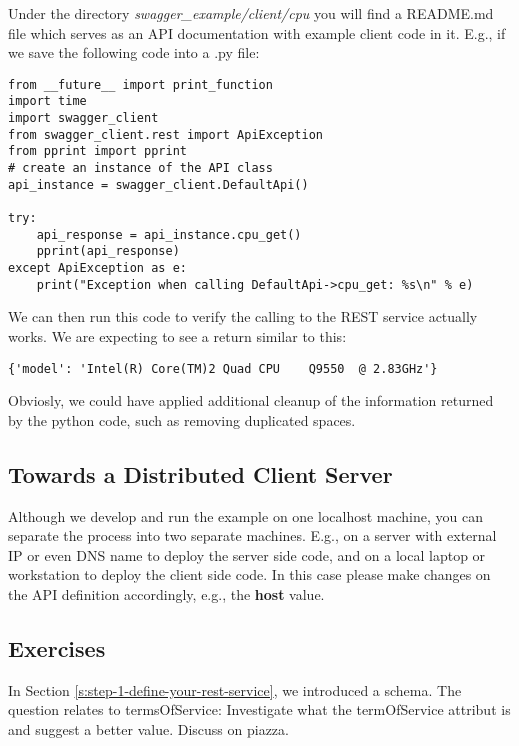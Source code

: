 Under the directory \emph{swagger\_example/client/cpu} you will find a
README.md file which serves as an API documentation with example client
code in it. E.g., if we save the following code into a .py file:

\begin{lstlisting}
from __future__ import print_function
import time
import swagger_client
from swagger_client.rest import ApiException
from pprint import pprint
# create an instance of the API class
api_instance = swagger_client.DefaultApi()

try:
    api_response = api_instance.cpu_get()
    pprint(api_response)
except ApiException as e:
    print("Exception when calling DefaultApi->cpu_get: %s\n" % e)
\end{lstlisting}

We can then run this code to verify the calling to the REST service
actually works. We are expecting to see a return similar to this:

\begin{lstlisting}
{'model': 'Intel(R) Core(TM)2 Quad CPU    Q9550  @ 2.83GHz'}
\end{lstlisting}

Obviosly, we could have applied additional cleanup of the information
returned by the python code, such as removing duplicated spaces.

\subsection{Towards a Distributed Client
Server}\label{towards-a-distributed-client-server}

Although we develop and run the example on one localhost machine, you
can separate the process into two separate machines. E.g., on a server
with external IP or even DNS name to deploy the server side code, and on
a local laptop or workstation to deploy the client side code. In this
case please make changes on the API definition accordingly, e.g., the
\textbf{host} value.

\subsection{Exercises}\label{s:swagger-exercises}

\begin{exercise}
  In Section \ref{s:step-1-define-your-rest-service}, we introduced a
  schema. The question relates to termsOfService: Investigate what the
  termOfService attribut is and suggest a better value. Discuss on
  piazza.
\end{exercise}

